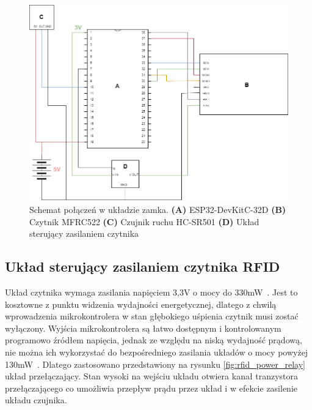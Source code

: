             \begin{figure}[]
                \centering
                \includegraphics[width=\textwidth]{chapters/images/lock_hardware_schematic.png}
                \caption[Schemat połączeń w układzie zamka] {
                    Schemat połączeń w układzie zamka.
                    \textbf{(A)} ESP32-DevKitC-32D
                    \textbf{(B)} Czytnik MFRC522
                    \textbf{(C)} Czujnik ruchu HC-SR501
                    \textbf{(D)} Układ sterujący zasilaniem czytnika
                }
                \label{fig:lock_hardware_schematic}
            \end{figure}

        \subsection{Układ sterujący zasilaniem czytnika RFID}

            Układ czytnika wymaga zasilania napięciem 3,3V o mocy do 330mW~\cite{mfrc522-ds}. Jest to kosztowne z punktu widzenia wydajności energetycznej, dlatego z chwilą wprowadzenia mikrokontrolera w stan głębokiego uśpienia czytnik musi zostać wyłączony. Wyjścia mikrokontrolera są łatwo dostępnym i kontrolowanym programowo źródłem napięcia, jednak ze względu na niską wydajność prądową, nie można ich wykorzystać do bezpośredniego zasilania układów o mocy powyżej 130mW~\cite{esp32-ds}. Dlatego zastosowano przedstawiony na rysunku \ref{fig:rfid_power_relay} układ przełączający. Stan wysoki na wejściu układu otwiera kanał tranzystora przełączającego co umożliwia przepływ prądu przez układ i w efekcie zasilenie układu czujnika.

